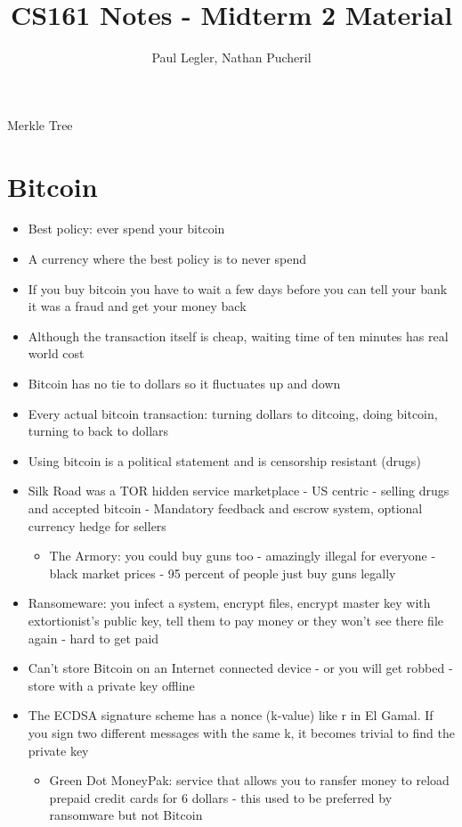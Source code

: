 \documentclass{article}
\title{CS161 Notes - Midterm 2 Material}
\author{Paul Legler, Nathan Pucheril}
\begin{document}
\maketitle
\tableofcontents
\newpage
Merkle Tree
\section{Bitcoin}
\begin{itemize}
\item Best policy: ever spend your bitcoin
\item A currency where the best policy is to never spend
\item If you buy bitcoin you have to wait a few days before you can tell your bank it was a fraud and get your money back
\item Although the transaction itself is cheap, waiting time of ten minutes has real world cost
\item Bitcoin has no tie to dollars so it fluctuates up and down
\item Every actual bitcoin transaction: turning dollars to ditcoing, doing bitcoin, turning to back to dollars
\item Using bitcoin is a political statement and is censorship resistant (drugs)
\item Silk Road was a TOR hidden service marketplace - US centric - selling drugs and accepted bitcoin - Mandatory feedback and escrow system, optional currency hedge for sellers
\begin{itemize}
\item The Armory: you could buy guns too - amazingly illegal for everyone - black market prices - 95 percent of people just buy guns legally
\end{itemize}
\item Ransomeware: you infect a system, encrypt files, encrypt master key with extortionist's public key, tell them to pay money or they won't see there file again - hard to get paid
\item Can't store Bitcoin on an Internet connected device - or you will get robbed - store with a private key offline
\item The ECDSA signature scheme has a nonce (k-value) like r in El Gamal. If you sign two different messages with the same k, it becomes trivial to find the private key
\begin{itemize}
\item Green Dot MoneyPak: service that allows you to ransfer money to reload prepaid credit cards for 6 dollars - this used to be preferred by ransomware but not Bitcoin

\end{itemize}
\end{itemize}
\end{document}
